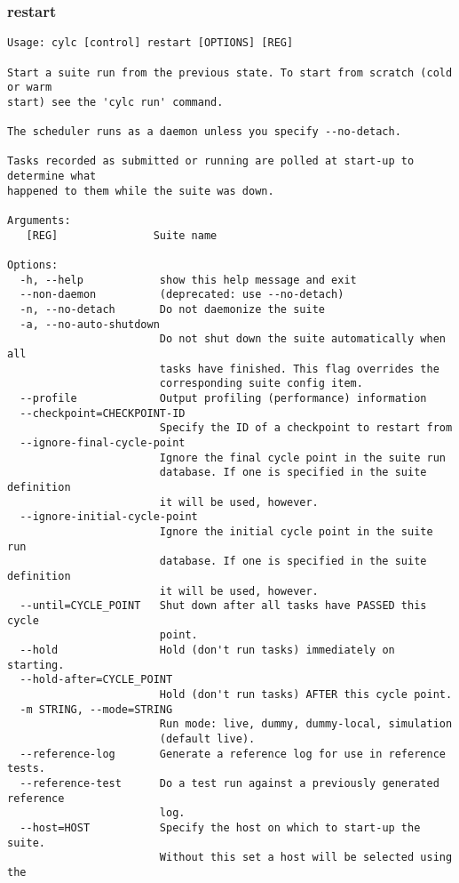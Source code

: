 \subsubsection{restart}
\label{restart}
\begin{lstlisting}
Usage: cylc [control] restart [OPTIONS] [REG] 

Start a suite run from the previous state. To start from scratch (cold or warm
start) see the 'cylc run' command.

The scheduler runs as a daemon unless you specify --no-detach.

Tasks recorded as submitted or running are polled at start-up to determine what
happened to them while the suite was down.

Arguments:
   [REG]               Suite name

Options:
  -h, --help            show this help message and exit
  --non-daemon          (deprecated: use --no-detach)
  -n, --no-detach       Do not daemonize the suite
  -a, --no-auto-shutdown
                        Do not shut down the suite automatically when all
                        tasks have finished. This flag overrides the
                        corresponding suite config item.
  --profile             Output profiling (performance) information
  --checkpoint=CHECKPOINT-ID
                        Specify the ID of a checkpoint to restart from
  --ignore-final-cycle-point
                        Ignore the final cycle point in the suite run
                        database. If one is specified in the suite definition
                        it will be used, however.
  --ignore-initial-cycle-point
                        Ignore the initial cycle point in the suite run
                        database. If one is specified in the suite definition
                        it will be used, however.
  --until=CYCLE_POINT   Shut down after all tasks have PASSED this cycle
                        point.
  --hold                Hold (don't run tasks) immediately on starting.
  --hold-after=CYCLE_POINT
                        Hold (don't run tasks) AFTER this cycle point.
  -m STRING, --mode=STRING
                        Run mode: live, dummy, dummy-local, simulation
                        (default live).
  --reference-log       Generate a reference log for use in reference tests.
  --reference-test      Do a test run against a previously generated reference
                        log.
  --host=HOST           Specify the host on which to start-up the suite.
                        Without this set a host will be selected using the

\end{lstlisting}
